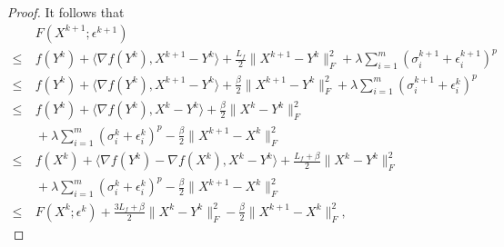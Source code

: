 \documentclass[twoside,11pt]{article}
\numberwithin{equation}{section}
\begin{document}
\begin{proof}
  It follows that 
  \begin{equation}\label{acc_dec_Strong}
    \begin{aligned}
          &\ F(X^{k+1};\epsilon^{k+1}) \\
      \le &\ f(Y^{k})+\langle \nabla{f (Y^{k})},X^{k+1}-Y^{k}\rangle + \frac{L_{f}}{2}\|X^{k+1}-Y^{k}\|_{F}^{2} +\lambda\sum\limits_{i=1}^{m} (\sigma_i^{k+1} +\epsilon_{i}^{k+1})^{p} \\
      \le &\ f(Y^{k})+\langle \nabla{f (Y^{k})},X^{k+1}-Y^{k}\rangle + \frac{\beta}{2} \|X^{k+1}-Y^{k}\|_{F}^{2} +\lambda\sum\limits_{i=1}^{m} (\sigma_i^{k+1} +\epsilon_{i}^{k})^{p} \\
      \le &\ f(Y^{k})+\langle \nabla{f (Y^{k})},X^{k}-Y^{k}\rangle+\frac{\beta}{2}\|X^{k}-Y^{k}\|_{F}^{2}  \\
          &\ +\lambda\sum\limits_{i=1}^{m} (\sigma_i^k+\epsilon_{i}^{k})^{p} - \frac{\beta}{2}\|X^{k+1}-X^{k}\|_{F}^{2} \\
      \le &\ f(X^{k})+\langle \nabla{f (Y^{k})-\nabla f (X^{k})},X^{k}-Y^{k}\rangle+\frac{L_{f}+\beta}{2}\|X^{k}-Y^{k}\|_{F}^{2}\\
          &\ +\lambda\sum\limits_{i=1}^{m} (\sigma_i^k+\epsilon_{i}^{k})^{p} - \frac{\beta}{2}\|X^{k+1}-X^{k}\|_{F}^{2} \\
      \le &\ F(X^{k};\epsilon^{k})+\frac{3L_{f}+\beta}{2}\|X^{k}-Y^{k}\|_{F}^{2}- \frac{\beta}{2}\|X^{k+1}-X^{k}\|_{F}^{2},
    \end{aligned}
  \end{equation}


\end{proof}
\end{document}
